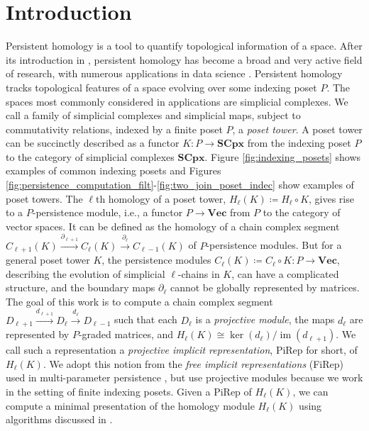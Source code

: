 \documentclass[english,a4paper,nolineno,cleveref]{socg-lipics-v2021}
\DeclareMathOperator{\im}{im}
\begin{document}
\section{Introduction} \label{sec:introduction}

Persistent homology is a tool to quantify topological information of a space. After its introduction in \cite{edelsbrunner2002topological}, persistent homology has become a broad and very active field of research, with numerous applications in data science \cite{dey2022computational,edelsbrunner2010computational,DONUT}. Persistent homology tracks topological features of a space evolving over some indexing poset $P$. The spaces most commonly considered in applications are simplicial complexes. We call a family of simplicial complexes and simplicial maps, subject to commutativity relations, indexed by a finite poset $P$, a \emph{poset tower}. A poset tower can be succinctly described as a functor $K\colon P\rightarrow \mathbf{SCpx}$ from the indexing poset $P$ to the category of simplicial complexes $\mathbf{SCpx}$. Figure \ref{fig:indexing_posets} shows examples of common indexing posets and Figures \ref{fig:persistence_computation_filt}-\ref{fig:two_join_poset_indec} show examples of poset towers. The $\ell$th homology of a poset tower, $H_\ell(K)\coloneqq H_\ell\circ K$, gives rise to a $P$-persistence module, i.e., a functor $P\rightarrow \mathbf{Vec}$ from $P$ to the category of vector spaces. It can be defined as the homology of a chain complex segment $C_{\ell+1}(K)\xrightarrow{\partial_{\ell+1}}C_\ell(K)\xrightarrow{\partial_\ell}C_{\ell\minus 1}(K)$ of $P$-persistence modules. But for a general poset tower $K$, the persistence modules $C_\ell(K)\coloneqq C_\ell\circ K\colon P\rightarrow\mathbf{Vec}$, describing the evolution of simplicial $\ell$-chains in $K$, can have a complicated structure, and the boundary maps $\partial_\ell$ cannot be globally represented by matrices. The goal of this work is to compute a chain complex segment $D_{\ell+1}\xrightarrow{d_{\ell+1}}D_{\ell}\xrightarrow{d_\ell}D_{\ell\minus 1}$ such that each $D_\ell$ is a \emph{projective module}, the maps $d_\ell$ are represented by $P$-graded matrices, and $H_\ell(K)\cong\ker(d_\ell) /\im(d_{\ell+1})$. We call such a representation a \emph{projective implicit representation}, PiRep for short, of $H_\ell(K)$. We adopt this notion from the \emph{free implicit representations} (FiRep) used in multi-parameter persistence \cite{Kerber2020FastMP}, but use projective modules because we work in the setting of finite indexing posets. Given a PiRep of $H_\ell(K)$, we can compute a minimal presentation of the homology module $H_\ell(K)$ using algorithms discussed in \cite{brown2024discretemicrolocalmorsetheory}.
\end{document}
